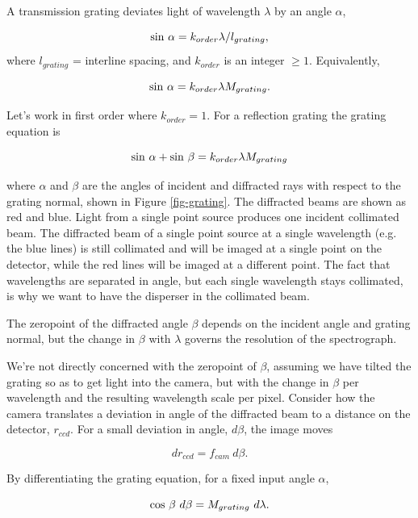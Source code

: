 \documentclass[12pt]{article}
\begin{document}
A transmission grating deviates light of wavelength $\lambda$
by an angle $\alpha$,

$$ {\rm sin}~\alpha = k_{order} \lambda / l_{grating}, $$
where $l_{grating}$ = interline spacing, and $k_{order}$ is an
integer $\geq 1$.  Equivalently,

$$ {\rm sin}~\alpha = k_{order} \lambda M_{grating}. $$

Let's work in first order where $k_{order} = 1$.
For a reflection grating the grating equation is 

$$ {\rm sin}~\alpha + {\rm sin}~\beta = k_{order} \lambda M_{grating} $$

where $\alpha$ and $\beta$ are the angles of incident and diffracted rays
with respect to the grating normal, shown in Figure
\ref{fig-grating}.  The diffracted beams are shown as red and blue.
Light from a single point source produces one incident collimated beam.
The diffracted beam of a single point source at a single
wavelength (e.g. the blue lines) is still collimated and will be
imaged at a single point on the detector, while the red lines will
be imaged at a different point.  The fact that wavelengths are
separated in angle, but each single wavelength stays collimated,
is why we want to have the disperser in the collimated beam.

The zeropoint of the diffracted
angle $\beta$ depends on the incident angle and grating normal, 
but the change in $\beta$ with $\lambda$ governs the resolution of 
the spectrograph.  


We're not directly concerned with the zeropoint of $\beta$, assuming
we have tilted the grating so as to get light into the camera,
but with the change in $\beta$ per wavelength and the resulting
wavelength scale per pixel.
Consider how the camera translates a deviation in angle of the
diffracted beam to a distance on the detector, $r_{ccd}$.  
For a small deviation in angle, $d\beta$, the image moves

$$  dr_{ccd} = f_{cam}~ d\beta. $$

By differentiating the grating equation, for a fixed 
input angle $\alpha$, 

$$ {\rm cos}~\beta~d\beta = M_{grating}~d\lambda.$$
\end{document}

